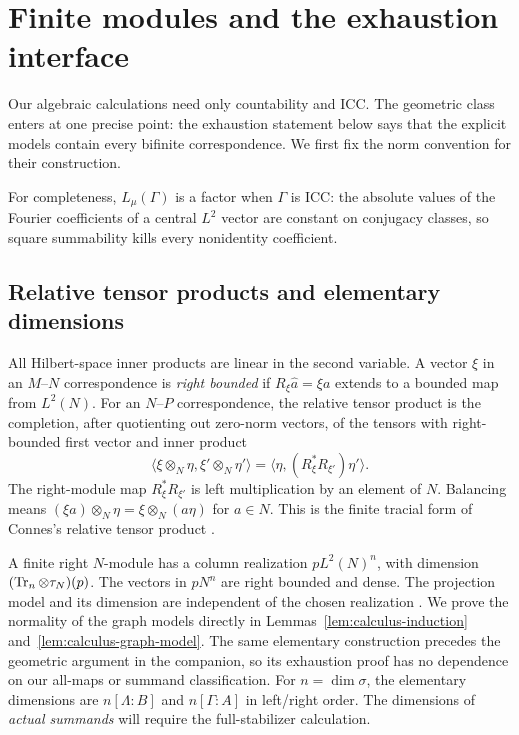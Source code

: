 \section{Finite modules and the exhaustion interface}\label{sec:setup}

Our algebraic calculations need only countability and ICC. The geometric
class enters at one precise point: the exhaustion statement below says
that the explicit models contain every bifinite correspondence. We first
fix the norm convention for their construction.

For completeness, $L_\mu(\Gamma)$ is a factor when $\Gamma$ is ICC:
the absolute values of the Fourier coefficients of a central $L^2$ vector
are constant on conjugacy classes, so square summability kills every
nonidentity coefficient.

\subsection{Relative tensor products and elementary dimensions}
All Hilbert-space inner products are linear in the second variable.
A vector $\xi$ in an $M$--$N$ correspondence is \emph{right bounded}
if $R_\xi\widehat a=\xi a$ extends to a bounded map from $L^2(N)$.
For an $N$--$P$ correspondence, the relative tensor product is the
completion, after quotienting out zero-norm vectors, of the tensors
with right-bounded first vector and inner product
\begin{equation}\label{eq:relative-inner-product}
 \langle\xi\otimes_N\eta,\xi'\otimes_N\eta'\rangle
 =\langle\eta,(R_\xi^*R_{\xi'})\eta'\rangle.
\end{equation}
The right-module map $R_\xi^*R_{\xi'}$ is left multiplication by an
element of $N$. Balancing means
$(\xi a)\otimes_N\eta=\xi\otimes_N(a\eta)$ for $a\in N$.
This is the finite tracial form of Connes's relative tensor product
\cite[Chapter V, Appendix B, Theorems~13 and~20]{Connes1994}.

A finite right $N$-module has a column realization $pL^2(N)^n$,
with dimension $(\operatorname{Tr}_n\otimes\tau_N)(p)$. The vectors in $pN^n$
are right bounded and dense. The projection model and its dimension
are independent of the chosen realization
\cite[Theorem~10.1.1 and Proposition~10.1.3]{Jones2009}.
We prove the normality of the graph models directly in
Lemmas~\ref{lem:calculus-induction} and~\ref{lem:calculus-graph-model}.
The same elementary construction precedes the geometric argument in the
companion, so its exhaustion proof has no dependence on our all-maps or
summand classification. For $n=\dim\sigma$, the elementary dimensions are
$n[\Lambda:B]$ and $n[\Gamma:A]$ in left/right order. The dimensions of
\emph{actual summands} will require the full-stabilizer calculation.

